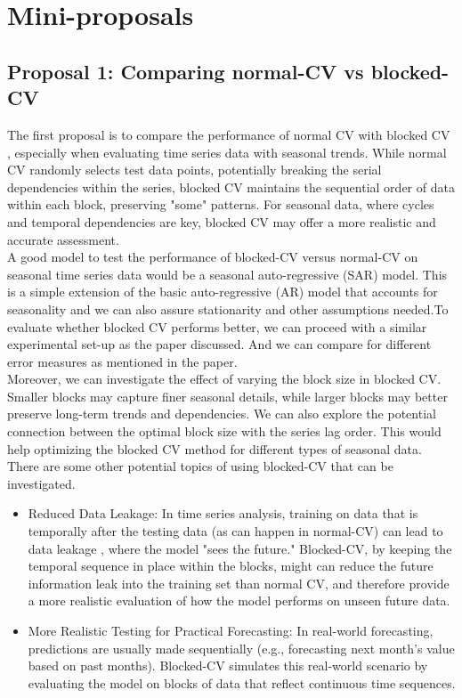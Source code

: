 \documentclass[12pt, oneside]{amsart}
\theoremstyle{definition}
\theoremstyle{remark}
\numberwithin{equation}{section}
\begin{document}
\section{Mini-proposals}

\subsection{Proposal 1: Comparing normal-CV vs blocked-CV} %
The first proposal is to compare the performance of normal CV with blocked CV \citep{Bergmeir2014}, especially when evaluating time series data with seasonal trends. While normal CV randomly selects test data points, potentially breaking the serial dependencies within the series, blocked CV maintains the sequential order of data within each block, preserving "some" patterns. For seasonal data, where cycles and temporal dependencies are key, blocked CV may offer a more realistic and accurate assessment.\\

A good model to test the performance of blocked-CV versus normal-CV on seasonal time series data would be a seasonal auto-regressive (SAR) model. This is a simple extension of the basic auto-regressive (AR) model that accounts for seasonality and we can also assure stationarity and other assumptions needed.To evaluate whether blocked CV performs better, we can proceed with a similar experimental set-up as the paper discussed. And we can compare for different error measures as mentioned in the paper. \\

Moreover, we can investigate the effect of varying the block size in blocked CV. Smaller blocks may capture finer seasonal details, while larger blocks may better preserve long-term trends and dependencies. We can also explore the potential connection between the optimal block size with the series lag order. This would help optimizing the blocked CV method for different types of seasonal data. There are some other potential topics of using blocked-CV that can be investigated.
\begin{itemize}
    \item Reduced Data Leakage: In time series analysis, training on data that is temporally after the testing data (as can happen in normal-CV) can lead to data leakage \citep{Shao}, where the model "sees the future." Blocked-CV, by keeping the temporal sequence in place within the blocks, might can reduce the future information leak into the training set than normal CV, and therefore provide a more realistic evaluation of how the model performs on unseen future data.
    \item More Realistic Testing for Practical Forecasting: In real-world forecasting, predictions are usually made sequentially (e.g., forecasting next month's value based on past months). Blocked-CV simulates this real-world scenario by evaluating the model on blocks of data that reflect continuous time sequences. 


\end{itemize}
\end{document}
